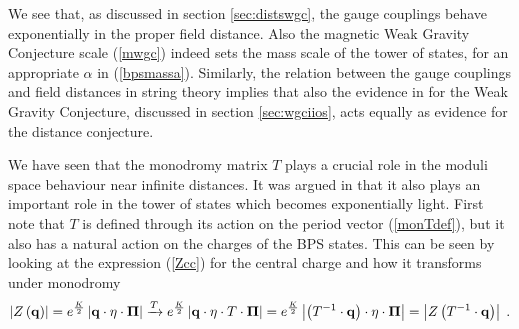 \documentclass[11pt,a4paper]{article}
\numberwithin{equation}{section}
\numberwithin{table}{section}\setlength{\multlinegap}{25pt}
\newcommand{\be}{\begin{equation}}
\newcommand{\ee}{\end{equation}}
\begin{document}
We see that, as discussed in section \ref{sec:distswgc}, the gauge couplings behave exponentially in the proper field distance. Also the magnetic Weak Gravity Conjecture scale (\ref{mwgc}) indeed sets the mass scale of the tower of states, for an appropriate $\alpha$ in (\ref{bpsmassa}). Similarly, the relation between the gauge couplings and field distances in string theory implies that also the evidence in \cite{Lee:2018urn,Lee:2018spm,Lee:2019tst} for the Weak Gravity Conjecture, discussed in section \ref{sec:wgciios}, acts equally as evidence for the distance conjecture.

We have seen that the monodromy matrix $T$ plays a crucial role in the moduli space behaviour near infinite distances. It was argued in \cite{Grimm:2018ohb,Grimm:2018cpv} that it also plays an important role in the tower of states which becomes exponentially light. First note that $T$ is defined through its action on the period vector (\ref{monTdef}), but it also has a natural action on the charges of the BPS states. This can be seen by looking at the expression (\ref{Zcc}) for the central charge and how it transforms under monodromy
\be
\left|Z\left({\bf q}\right)\right| = e^{\frac{K}{2}}\left|{\bf q} \cdot \eta \cdot {\bf \Pi } \right| \xrightarrow{T}  e^{\frac{K}{2}}\left|{\bf q} \cdot \eta \cdot T \cdot {\bf \Pi } \right|  = e^{\frac{K}{2}}\left|\left(T^{-1} \cdot {\bf q} \right) \cdot \eta \cdot {\bf \Pi }\right| =  \left|Z\left(T^{-1} \cdot{\bf q}\right)\right|  \;. \label{bpsmonorb}
\ee
\end{document}
